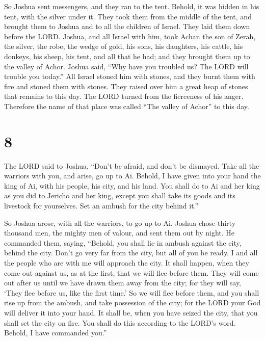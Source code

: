  So Joshua sent messengers, and they ran to the tent.
Behold, it was hidden in his tent, with the silver under it.
 They took them from the middle of the tent, and brought
them to Joshua and to all the children of Israel. They laid them down
before the LORD.  Joshua, and all Israel with him, took
Achan the son of Zerah, the silver, the robe, the wedge of gold, his
sons, his daughters, his cattle, his donkeys, his sheep, his tent, and
all that he had; and they brought them up to the valley of Achor.
 Joshua said, ``Why have you troubled us? The LORD will
trouble you today.'' All Israel stoned him with stones, and they burnt
them with fire and stoned them with stones.  They raised
over him a great heap of stones that remains to this day. The LORD
turned from the fierceness of his anger. Therefore the name of that
place was called ``The valley of Achor'' to this day.

\hypertarget{section-7}{%
\section{8}\label{section-7}}

 The LORD said to Joshua, ``Don't be afraid, and don't be
dismayed. Take all the warriors with you, and arise, go up to Ai.
Behold, I have given into your hand the king of Ai, with his people, his
city, and his land.  You shall do to Ai and her king as
you did to Jericho and her king, except you shall take its goods and its
livestock for yourselves. Set an ambush for the city behind it.''

 So Joshua arose, with all the warriors, to go up to Ai.
Joshua chose thirty thousand men, the mighty men of valour, and sent
them out by night.  He commanded them, saying, ``Behold,
you shall lie in ambush against the city, behind the city. Don't go very
far from the city, but all of you be ready.  I and all the
people who are with me will approach the city. It shall happen, when
they come out against us, as at the first, that we will flee before
them.  They will come out after us until we have drawn
them away from the city; for they will say, `They flee before us, like
the first time.' So we will flee before them,  and you
shall rise up from the ambush, and take possession of the city; for the
LORD your God will deliver it into your hand.  It shall
be, when you have seized the city, that you shall set the city on fire.
You shall do this according to the LORD's word. Behold, I have commanded
you.''

